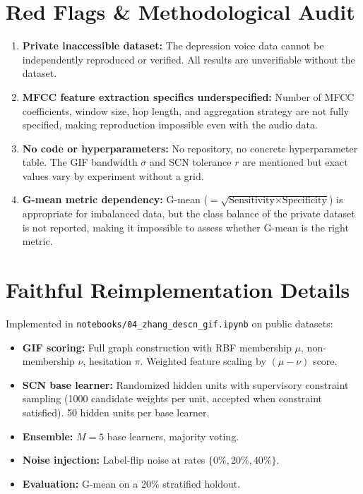 \documentclass[12pt,a4paper]{article}
\begin{document}
\section{Red Flags \& Methodological Audit}
\begin{enumerate}[leftmargin=*]
  \item \textbf{Private inaccessible dataset:} The depression voice data cannot be independently reproduced or verified. All results are unverifiable without the dataset.
  \item \textbf{MFCC feature extraction specifics underspecified:} Number of MFCC coefficients, window size, hop length, and aggregation strategy are not fully specified, making reproduction impossible even with the audio data.
  \item \textbf{No code or hyperparameters:} No repository, no concrete hyperparameter table. The GIF bandwidth $\sigma$ and SCN tolerance $r$ are mentioned but exact values vary by experiment without a grid.
  \item \textbf{G-mean metric dependency:} G-mean ($= \sqrt{\text{Sensitivity} \times \text{Specificity}}$) is appropriate for imbalanced data, but the class balance of the private dataset is not reported, making it impossible to assess whether G-mean is the right metric.
\end{enumerate}

\section{Faithful Reimplementation Details}
Implemented in \texttt{notebooks/04\_zhang\_descn\_gif.ipynb} on public datasets:
\begin{itemize}[leftmargin=*]
  \item \textbf{GIF scoring:} Full graph construction with RBF membership $\mu$, non-membership $\nu$, hesitation $\pi$. Weighted feature scaling by $(\mu - \nu)$ score.
  \item \textbf{SCN base learner:} Randomized hidden units with supervisory constraint sampling (1000 candidate weights per unit, accepted when constraint satisfied). 50 hidden units per base learner.
  \item \textbf{Ensemble:} $M=5$ base learners, majority voting.
  \item \textbf{Noise injection:} Label-flip noise at rates $\{0\%, 20\%, 40\%\}$.
  \item \textbf{Evaluation:} G-mean on a 20\% stratified holdout.
\end{itemize}
\end{document}
